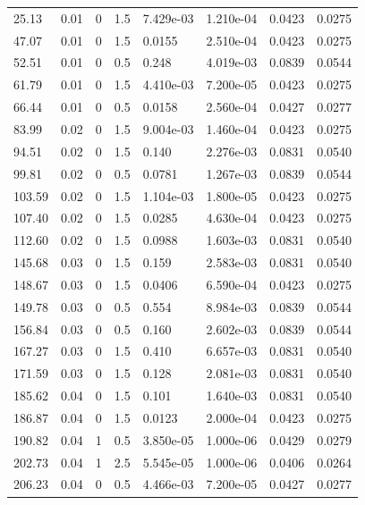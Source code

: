 \documentclass[preview]{standalone}
\begin{document}
{{\begin{tabular}{L{1.2cm}C{1.2cm} C{0.3cm}C{0.5cm} C{1.4cm}C{1.4cm} C{1.4cm}C{1.4cm}}
  25.13  &  0.01  & 0     & 1.5 &  7.429e-03  & 1.210e-04  & 0.0423 &  0.0275   \\ 
  47.07  &  0.01  & 0     & 1.5 &  0.0155  & 2.510e-04  & 0.0423 &  0.0275   \\ 
  52.51  &  0.01  & 0     & 0.5 &  0.248  & 4.019e-03  & 0.0839 &  0.0544   \\ 
  61.79  &  0.01  & 0     & 1.5 &  4.410e-03  & 7.200e-05  & 0.0423 &  0.0275   \\ 
  66.44  &  0.01  & 0     & 0.5 &  0.0158  & 2.560e-04  & 0.0427 &  0.0277   \\ 
  83.99  &  0.02  & 0     & 1.5 &  9.004e-03  & 1.460e-04  & 0.0423 &  0.0275   \\ 
  94.51  &  0.02  & 0     & 1.5 &  0.140  & 2.276e-03  & 0.0831 &  0.0540   \\ 
  99.81  &  0.02  & 0     & 0.5 &  0.0781  & 1.267e-03  & 0.0839 &  0.0544   \\ 
  103.59  &  0.02  & 0     & 1.5 &  1.104e-03  & 1.800e-05  & 0.0423 &  0.0275   \\ 
  107.40  &  0.02  & 0     & 1.5 &  0.0285  & 4.630e-04  & 0.0423 &  0.0275   \\ 
  112.60  &  0.02  & 0     & 1.5 &  0.0988  & 1.603e-03  & 0.0831 &  0.0540   \\ 
  145.68  &  0.03  & 0     & 1.5 &  0.159  & 2.583e-03  & 0.0831 &  0.0540   \\ 
  148.67  &  0.03  & 0     & 1.5 &  0.0406  & 6.590e-04  & 0.0423 &  0.0275   \\ 
  149.78  &  0.03  & 0     & 0.5 &  0.554  & 8.984e-03  & 0.0839 &  0.0544   \\ 
  156.84  &  0.03  & 0     & 0.5 &  0.160  & 2.602e-03  & 0.0839 &  0.0544   \\ 
  167.27  &  0.03  & 0     & 1.5 &  0.410  & 6.657e-03  & 0.0831 &  0.0540   \\ 
  171.59  &  0.03  & 0     & 1.5 &  0.128  & 2.081e-03  & 0.0831 &  0.0540   \\ 
  185.62  &  0.04  & 0     & 1.5 &  0.101  & 1.640e-03  & 0.0831 &  0.0540   \\ 
  186.87  &  0.04  & 0     & 1.5 &  0.0123  & 2.000e-04  & 0.0423 &  0.0275   \\ 
  190.82  &  0.04  & 1     & 0.5 &  3.850e-05  & 1.000e-06  & 0.0429 &  0.0279   \\ 
  202.73  &  0.04  & 1     & 2.5 &  5.545e-05  & 1.000e-06  & 0.0406 &  0.0264   \\ 
  206.23  &  0.04  & 0     & 0.5 &  4.466e-03  & 7.200e-05  & 0.0427 &  0.0277   \\ 

\end{tabular}}}
\end{document}
